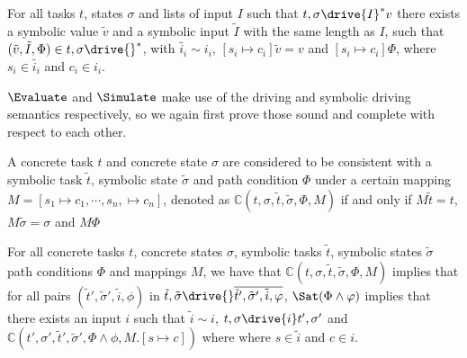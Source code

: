 \begin{lemma}
  \label{lem:completesimulate}
  For all tasks $t$, states $\sigma$ and lists of input $I$
  such that $t,\sigma\drive{I}^*v$
  there exists a symbolic value $\tilde{v}$ and a symbolic input $\tilde{I}$ with the same length as $I$,
  such that $(\tilde{v},\tilde{I},\Phi)\in t,\sigma\drive{}^*$,
  with $\tilde{i_i}\sim i_i$, $[s_i\mapsto c_i]\tilde{v}=v$ and $[s_i\mapsto c_i]\Phi$,
  where $s_i\in\tilde{i_i}$ and $c_i\in i_i$.
\end{lemma}


$\Evaluate$ and $\Simulate$ make use of the driving and symbolic driving semantics respectively, so we again first prove those sound and complete with respect to each other.


\begin{definition}
A concrete task $t$ and concrete state $\sigma$
are considered to be consistent with a symbolic task $\tilde{t}$, symbolic state $\tilde{\sigma}$ and path condition $\Phi$
under a certain mapping $M=[s_1\mapsto c_1,\cdots,s_n,\mapsto c_n]$, denoted as $\mathds{C}(t,\sigma,\tilde{t},\tilde{\sigma},\Phi,M)$
if and only if $M\tilde{t}=t$, $M\tilde{\sigma}=\sigma$ and $M\Phi$
\end{definition}

\begin{lemma}
  \label{lem:sounddriving}
  For all concrete tasks $t$, concrete states $\sigma$, symbolic tasks $\tilde{t}$, symbolic states $\tilde{\sigma}$ path conditions $\Phi$ and mappings $M$,
  we have that $\mathds{C}(t,\sigma,\tilde{t},\tilde{\sigma},\Phi,M)$ implies
  that for all pairs $(\tilde{t}',\tilde{\sigma}',\tilde{i},\phi)$ in $\tilde{t},\tilde{\sigma}\drive{}\overline{\tilde{t}',\tilde{\sigma}',\tilde{i},\phi}$,
  $\Sat(\Phi\land\phi)$ implies that there exists an input $i$ such that $\tilde{i}\sim i$,  $t,\sigma\drive{i}t',\sigma'$ and $\mathds{C}(t',\sigma',\tilde{t}',\tilde{\sigma}',\Phi\land\phi,M.[s\mapsto c])$ where where $s\in\tilde{i}$ and $c\in i$.
\end{lemma}

